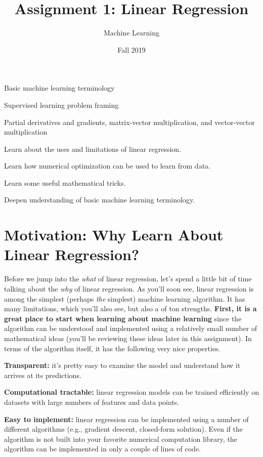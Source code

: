 \documentclass[assignment01_Solutions]{subfiles}
\title{Assignment 1: Linear Regression}
\author{Machine Learning}
\date{Fall 2019}
\begin{document}
\maketitle
\thispagestyle{firstpage}

\begin{priorknowledge}

\bi
\item Basic machine learning terminology
\item Supervised learning problem framing
\item Partial derivatives and gradients, matrix-vector multiplication, and vector-vector multiplication
\ei
\end{priorknowledge}


\begin{learningobjectives}
\bi
\item Learn about the uses and limitations of linear regression.
\item Learn how numerical optimization can be used to learn from data.
\item Learn some useful mathematical tricks.
\item Deepen understanding of basic machine learning terminology.
\ei
\end{learningobjectives}

\section*{Motivation: Why Learn About Linear Regression?}
Before we jump into the \emph{what} of linear regression, let's spend a little bit of time talking about the \emph{why} of linear regression.  As you'll soon see, linear regression is among the simplest (perhaps \emph{the} simplest) machine learning algorithm.  It has many limitations, which you'll also see, but also a of ton strengths.  \textbf{First, it is a great place to start when learning about machine learning} since the algorithm can be understood and implemented using a relatively small number of mathematical ideas (you'll be reviewing these ideas later in this assignment).  In terms of the algorithm itself, it has the following very nice properties.

\bi
\item \textbf{Transparent:} it's pretty easy to examine the model and understand how it arrives at its predictions.
\item \textbf{Computational tractable:} linear regression models can be trained efficiently on datasets with large numbers of features and data points.
\item \textbf{Easy to implement:} linear regression can be implemented using a number of different algorithms (e.g., gradient descent, closed-form solution).  Even if the algorithm is not built into your favorite numerical computation library, the algorithm can be implemented in only a couple of lines of code.
\ei
\end{document}

